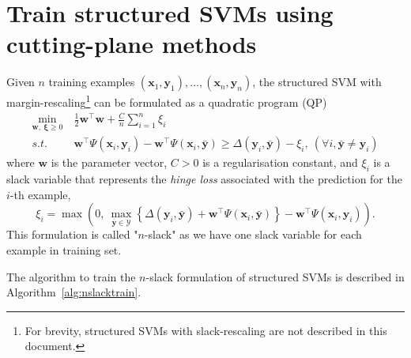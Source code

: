 \documentclass[9pt]{extarticle}
\newcommand{\eat}[1]{}
\begin{document}
\eat{citation}



\section{Train structured SVMs using cutting-plane methods}
\label{sec:ssvm}

Given $n$ training examples $(\mathbf{x}_1, \mathbf{y}_1), \dots, (\mathbf{x}_n, \mathbf{y}_n)$, 
the structured SVM with margin-rescaling\footnote{For brevity, structured SVMs with slack-rescaling are not described in this document.}
can be formulated as a quadratic program (QP)
\begin{equation}
\label{eq:nslackform}
\begin{aligned}
\min_{\mathbf{w}, ~\bm{\xi} \ge 0} ~& \frac{1}{2} \mathbf{w}^\top \mathbf{w} + \frac{C}{n} \sum_{i=1}^n \xi_i \\
s.t.~~ ~& \mathbf{w}^\top \Psi(\mathbf{x}_i, \mathbf{y}_i) - \mathbf{w}^\top \Psi(\mathbf{x}_i, \bar{\mathbf{y}}) \ge 
       \Delta(\mathbf{y}_i, \bar{\mathbf{y}}) - \xi_i, ~(\forall i, \bar{\mathbf{y}} \neq \mathbf{y}_i)
\end{aligned}
\end{equation}
where $\mathbf{w}$ is the parameter vector, $C > 0$ is a regularisation constant, and $\xi_i$
is a slack variable that represents the \emph{hinge loss} associated with the prediction for the $i$-th example,
\begin{equation*}
\xi_i = \max \left( 0,~ 
        \max_{\bar{\mathbf{y}} \in \mathcal{Y}} 
        \left\{ \Delta(\mathbf{y}_i, \bar{\mathbf{y}}) + \mathbf{w}^\top \Psi(\mathbf{x}_i, \bar{\mathbf{y}}) \right\} -
        \mathbf{w}^\top \Psi(\mathbf{x}_i, \mathbf{y}_i) \right).
\end{equation*}
This formulation is called "$n$-slack" as we have one slack variable for each example in training set. \eat{citation}

The algorithm to train the $n$-slack formulation of structured SVMs is described in Algorithm~\ref{alg:nslacktrain}.
\end{document}
